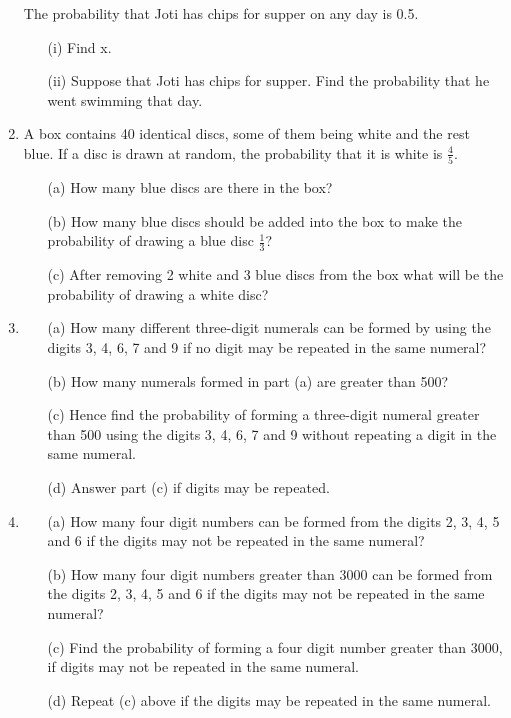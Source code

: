 \begin{enumerate}
	\noindent The probability that Joti has chips for supper on any day is 0.5.
	\begin{itemize}
	\item[(i)] Find x.
	\item[(ii)] Suppose that Joti has chips for supper. Find the probability that he went swimming that day.
	\end{itemize}
	
	
	
	
	\item A box contains 40 identical discs, some of them being white and the rest blue. If a disc is drawn at random, the probability that it is white is $\frac{4}{5}$.
	\begin{itemize}
	\item[(a)] How many blue discs are there in the box?
	\item[(b)] How many blue discs should be added into the box to make the probability of drawing a blue disc $\frac{1}{3}$?
	\item[(c)] After removing 2 white and 3 blue discs from the box what will be the probability of drawing a white disc?
	\end{itemize}

	
	
	
	
	
	
	
	
	\item 
	\begin{itemize}
	\item[(a)] How many different three-digit numerals can be formed by using the digits 3, 4, 6, 7 and 9 if no digit may be repeated in the same numeral?
	\item[(b)] How many numerals formed in part (a) are greater than 500?
	\item[(c)] Hence find the probability of forming a three-digit numeral greater than 500 using the digits 3, 4, 6, 7 and 9 without repeating a digit in the same numeral.
	\item[(d)] Answer part (c) if digits may be repeated.
	\end{itemize}
	
	\item
	\begin{itemize}
	\item[(a)] How many four digit numbers can be formed from the digits 2, 3, 4, 5 and 6 if the digits may not be repeated in the same numeral?
	\item[(b)] How many four digit numbers greater than 3000 can be formed from the digits 2, 3, 4, 5 and 6 if the digits may not be repeated in the same numeral?
	\item[(c)] Find the probability of forming a four digit number greater than 3000, if digits may not be repeated in the same numeral.
	\item[(d)] Repeat (c) above if the digits may be repeated in the same numeral.
	\end{itemize}
	

\end{enumerate}

